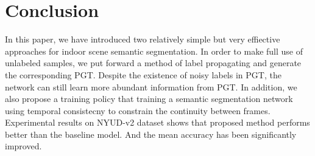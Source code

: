 \section{Conclusion}
\label{sec:conclusion}
In this paper, we have introduced two relatively simple but very effiective approaches for indoor scene semantic segmentation.  
%
In order to make full use of unlabeled samples, we put forward a method of label propagating and generate the corresponding PGT.
%
Despite the existence of noisy labels in PGT, the network can still learn more abundant information from PGT.
%
In addition, we also propose a training policy that training a semantic segmentation network using temporal consistecny to constrain the continuity between frames.
%
Experimental results on NYUD-v2 dataset shows that proposed method performs
better than the baseline model. 
%
And the mean accuracy has been significantly improved.

%
%

